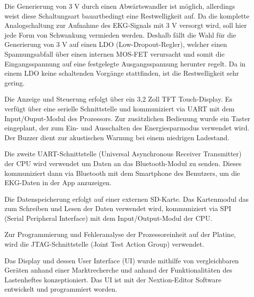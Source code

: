 Die Generierung von 3 V durch einen Abwärtswandler ist möglich, allerdings weist diese Schaltungsart bauartbedingt eine Restwelligkeit auf. Da die komplette Analogschaltung zur Aufnahme des EKG-Signals mit 3 V versorgt wird, soll hier jede Form von Schwankung vermieden werden.
Deshalb fällt die Wahl für die Generierung von 3 V auf einen LDO (Low-Dropout-Regler), welcher einen Spannungsabfall über einen internen MOS-FET verursacht und somit die Eingangsspannung auf eine festgelegte Ausgangsspannung herunter regelt. Da in einem LDO keine schaltenden Vorgänge stattfinden, ist die Restwelligkeit sehr gering.

Die Anzeige und Steuerung erfolgt über ein 3,2 Zoll TFT Touch-Display. Es verfügt über eine serielle Schnittstelle und kommuniziert via UART mit dem Input/Ouput-Modul des Prozessors. Zur zusätzlichen Bedienung wurde ein Taster eingeplant, der zum Ein- und Ausschalten des Energiesparmodus verwendet wird. Der Buzzer dient zur akustischen Warnung bei einem niedrigen Ladestand.

Die zweite UART-Schnittstelle (Universal Asynchronous Receiver Transmitter) der CPU wird verwendet um Daten an das Bluetooth-Modul zu senden. Dieses kommuniziert dann via Bluetooth mit dem Smartphone des Benutzers, um die EKG-Daten in der App anzuzeigen.

Die Datenspeicherung erfolgt auf einer externen SD-Karte. Das Kartenmodul das zum Schreiben und Lesen der Daten verwendet wird, kommuniziert via SPI (Serial Peripheral Interface) mit dem Input/Output-Modul der CPU.

Zur Programmierung und Fehleranalyse der Prozessoreinheit auf der Platine, wird die JTAG-Schnittstelle (Joint Test Action Group) verwendet.

Das Display und dessen User Interface (UI) wurde mithilfe von vergleichbaren Geräten anhand einer Marktrecherche und anhand der Funktionalitäten des Lastenheftes konzeptioniert. Das UI ist mit der Nextion-Editor Software entwickelt und programmiert worden.

